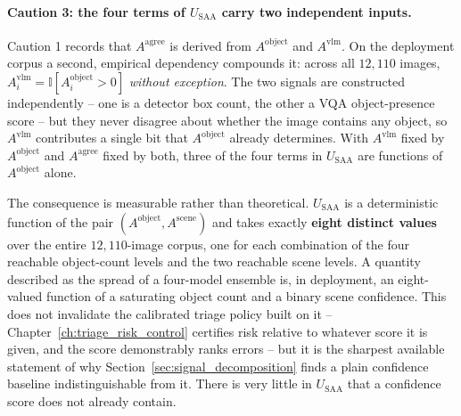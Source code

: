 \documentclass[12pt,a4paper]{report}
\begin{document}
\paragraph{Caution 3: the four terms of $U_{\text{SAA}}$ carry two independent inputs.} Caution 1 records that $A^{\text{agree}}$ is derived from $A^{\text{object}}$ and $A^{\text{vlm}}$. On the deployment corpus a second, empirical dependency compounds it: across all $12{,}110$ images, $A_i^{\text{vlm}} = \mathbb{I}[A_i^{\text{object}} > 0]$ \emph{without exception}. The two signals are constructed independently -- one is a detector box count, the other a VQA object-presence score -- but they never disagree about whether the image contains any object, so $A^{\text{vlm}}$ contributes a single bit that $A^{\text{object}}$ already determines. With $A^{\text{vlm}}$ fixed by $A^{\text{object}}$ and $A^{\text{agree}}$ fixed by both, three of the four terms in $U_{\text{SAA}}$ are functions of $A^{\text{object}}$ alone.

The consequence is measurable rather than theoretical. $U_{\text{SAA}}$ is a deterministic function of the pair $(A^{\text{object}}, A^{\text{scene}})$ and takes exactly \textbf{eight distinct values} over the entire $12{,}110$-image corpus, one for each combination of the four reachable object-count levels and the two reachable scene levels. A quantity described as the spread of a four-model ensemble is, in deployment, an eight-valued function of a saturating object count and a binary scene confidence. This does not invalidate the calibrated triage policy built on it -- Chapter~\ref{ch:triage_risk_control} certifies risk relative to whatever score it is given, and the score demonstrably ranks errors -- but it is the sharpest available statement of why Section~\ref{sec:signal_decomposition} finds a plain confidence baseline indistinguishable from it. There is very little in $U_{\text{SAA}}$ that a confidence score does not already contain.
\end{document}
